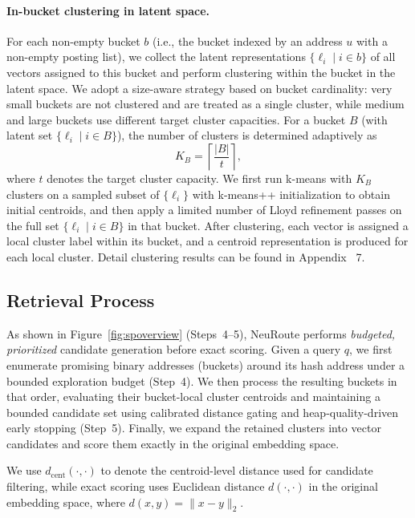 \documentclass[sigconf, nonacm]{acmart}
\begin{document}
\paragraph{In-bucket clustering in latent space.}
For each non-empty bucket $b$ (i.e., the bucket indexed by an address $u$ with a non-empty posting list), we collect the latent representations
$\{\ell_i \mid i \in b\}$ of all vectors assigned to this bucket and perform clustering within the bucket in the latent space.
We adopt a size-aware strategy based on bucket cardinality: very small buckets are not clustered and are treated as a single cluster,
while medium and large buckets use different target cluster capacities.
For a bucket $B$ (with latent set $\{\ell_i \mid i\in B\}$), the number of clusters is determined adaptively as
\[
K_B=\left\lceil \frac{|B|}{t} \right\rceil,
\]
where $t$ denotes the target cluster capacity.
We first run k-means with $K_B$ clusters on a sampled subset of $\{\ell_i\}$ with k-means++ initialization to obtain initial centroids,
and then apply a limited number of Lloyd refinement passes on the full set $\{\ell_i \mid i \in B\}$ in that bucket.
After clustering, each vector is assigned a local cluster label within its bucket, and a centroid representation is produced for each local cluster. Detail clustering results can be found in Appendix ~7.


\subsection{Retrieval Process}
\label{subsec:retrieval}

As shown in Figure~\ref{fig:spoverview} (Steps~4--5), NeuRoute performs \emph{budgeted, prioritized} candidate generation before exact scoring. Given a query $q$, we first enumerate promising binary addresses (buckets) around its hash address under a bounded exploration budget (Step~4). We then process the resulting buckets in that order, evaluating their bucket-local cluster centroids and maintaining a bounded candidate set using calibrated distance gating and heap-quality-driven early stopping (Step~5). Finally, we expand the retained clusters into vector candidates and score them exactly in the original embedding space.

We use $d_{\text{cent}}(\cdot,\cdot)$ to denote the centroid-level distance used for candidate filtering, while exact scoring uses Euclidean distance $d(\cdot,\cdot)$ in the original embedding space, where $d(x,y)=\|x-y\|_2$.
\end{document}
